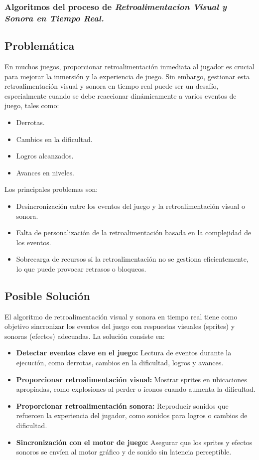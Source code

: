 \subsubsection{Algoritmos del proceso de \textit{Retroalimentacion Visual y Sonora en Tiempo Real.}}

\subsection*{Problemática}
En muchos juegos, proporcionar retroalimentación inmediata al jugador es crucial para mejorar la inmersión y la experiencia de juego. Sin embargo, gestionar esta retroalimentación visual y sonora en tiempo real puede ser un desafío, especialmente cuando se debe reaccionar dinámicamente a varios eventos de juego, tales como:
\begin{itemize}
    \item Derrotas.
    \item Cambios en la dificultad.
    \item Logros alcanzados.
    \item Avances en niveles.
\end{itemize}

Los principales problemas son:
\begin{itemize}
    \item Desincronización entre los eventos del juego y la retroalimentación visual o sonora.
    \item Falta de personalización de la retroalimentación basada en la complejidad de los eventos.
    \item Sobrecarga de recursos si la retroalimentación no se gestiona eficientemente, lo que puede provocar retrasos o bloqueos.
\end{itemize}

\subsection*{Posible Solución}
El algoritmo de retroalimentación visual y sonora en tiempo real tiene como objetivo sincronizar los eventos del juego con respuestas visuales (sprites) y sonoras (efectos) adecuadas. La solución consiste en:
\begin{itemize}
    \item \textbf{Detectar eventos clave en el juego:} Lectura de eventos durante la ejecución, como derrotas, cambios en la dificultad, logros y avances.
    \item \textbf{Proporcionar retroalimentación visual:} Mostrar sprites en ubicaciones apropiadas, como explosiones al perder o íconos cuando aumenta la dificultad.
    \item \textbf{Proporcionar retroalimentación sonora:} Reproducir sonidos que refuercen la experiencia del jugador, como sonidos para logros o cambios de dificultad.
    \item \textbf{Sincronización con el motor de juego:} Asegurar que los sprites y efectos sonoros se envíen al motor gráfico y de sonido sin latencia perceptible.
\end{itemize}

